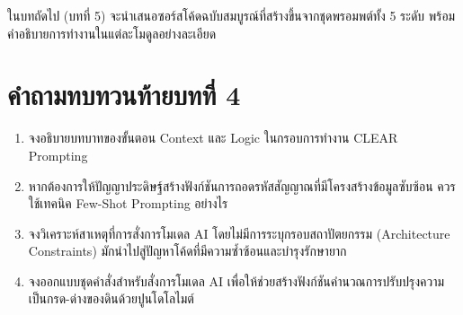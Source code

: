 ในบทถัดไป (บทที่ 5) จะนำเสนอซอร์สโค้ดฉบับสมบูรณ์ที่สร้างขึ้นจากชุดพรอมพต์ทั้ง 5 ระดับ พร้อมคำอธิบายการทำงานในแต่ละโมดูลอย่างละเอียด

\section*{คำถามทบทวนท้ายบทที่ 4}

\begin{enumerate}
    \item จงอธิบายบทบาทของขั้นตอน Context และ Logic ในกรอบการทำงาน CLEAR Prompting
    \item หากต้องการให้ปัญญาประดิษฐ์สร้างฟังก์ชันการถอดรหัสสัญญาณที่มีโครงสร้างข้อมูลซับซ้อน ควรใช้เทคนิค Few-Shot Prompting อย่างไร
    \item จงวิเคราะห์สาเหตุที่การสั่งการโมเดล AI โดยไม่มีการระบุกรอบสถาปัตยกรรม (Architecture Constraints) มักนำไปสู่ปัญหาโค้ดที่มีความซ้ำซ้อนและบำรุงรักษายาก
    \item จงออกแบบชุดคำสั่งสำหรับสั่งการโมเดล AI เพื่อให้ช่วยสร้างฟังก์ชันคำนวณการปรับปรุงความเป็นกรด-ด่างของดินด้วยปูนโดโลไมต์
\end{enumerate}
